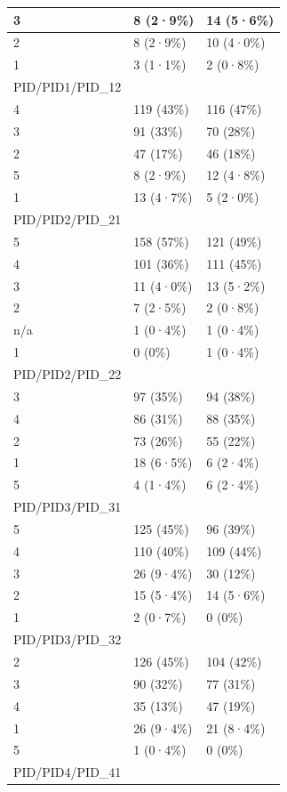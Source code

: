 \documentclass[
]{book}
\begin{document}
\begin{tabular}{l|l|l}
\hline
3 & 8 (2·9\%) & 14 (5·6\%)\\
\hline
2 & 8 (2·9\%) & 10 (4·0\%)\\
\hline
1 & 3 (1·1\%) & 2 (0·8\%)\\
\hline
PID/PID1/PID\_12 &  & \\
\hline
4 & 119 (43\%) & 116 (47\%)\\
\hline
3 & 91 (33\%) & 70 (28\%)\\
\hline
2 & 47 (17\%) & 46 (18\%)\\
\hline
5 & 8 (2·9\%) & 12 (4·8\%)\\
\hline
1 & 13 (4·7\%) & 5 (2·0\%)\\
\hline
PID/PID2/PID\_21 &  & \\
\hline
5 & 158 (57\%) & 121 (49\%)\\
\hline
4 & 101 (36\%) & 111 (45\%)\\
\hline
3 & 11 (4·0\%) & 13 (5·2\%)\\
\hline
2 & 7 (2·5\%) & 2 (0·8\%)\\
\hline
n/a & 1 (0·4\%) & 1 (0·4\%)\\
\hline
1 & 0 (0\%) & 1 (0·4\%)\\
\hline
PID/PID2/PID\_22 &  & \\
\hline
3 & 97 (35\%) & 94 (38\%)\\
\hline
4 & 86 (31\%) & 88 (35\%)\\
\hline
2 & 73 (26\%) & 55 (22\%)\\
\hline
1 & 18 (6·5\%) & 6 (2·4\%)\\
\hline
5 & 4 (1·4\%) & 6 (2·4\%)\\
\hline
PID/PID3/PID\_31 &  & \\
\hline
5 & 125 (45\%) & 96 (39\%)\\
\hline
4 & 110 (40\%) & 109 (44\%)\\
\hline
3 & 26 (9·4\%) & 30 (12\%)\\
\hline
2 & 15 (5·4\%) & 14 (5·6\%)\\
\hline
1 & 2 (0·7\%) & 0 (0\%)\\
\hline
PID/PID3/PID\_32 &  & \\
\hline
2 & 126 (45\%) & 104 (42\%)\\
\hline
3 & 90 (32\%) & 77 (31\%)\\
\hline
4 & 35 (13\%) & 47 (19\%)\\
\hline
1 & 26 (9·4\%) & 21 (8·4\%)\\
\hline
5 & 1 (0·4\%) & 0 (0\%)\\
\hline
PID/PID4/PID\_41 &  & \\

\end{tabular}
\end{document}
